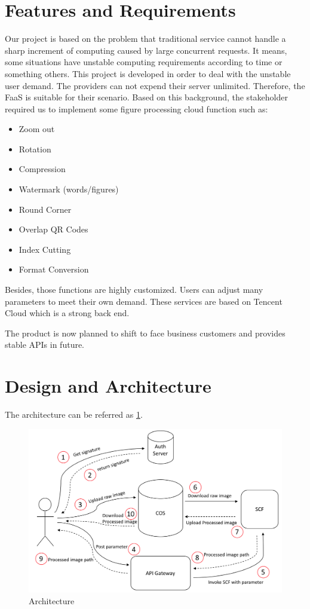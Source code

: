 \documentclass[a4paper,12pt]{article}
\begin{document}
\section{Features and Requirements}
Our project is based on the problem that traditional service cannot handle a sharp increment of computing caused by large concurrent requests. It means, some situations have unstable computing requirements according to time or something others. This project is developed in order to deal with the unstable user demand. The providers can not expend their server unlimited. Therefore, the FaaS is suitable for their scenario. Based on this background, the stakeholder required us to implement some figure processing cloud function such as:
\begin{itemize}
    \item Zoom out
    \item Rotation
    \item Compression
    \item Watermark (words/figures)
    \item Round Corner
    \item Overlap QR Codes
    \item Index Cutting
    \item Format	Conversion
\end{itemize}

Besides, those functions are highly customized. Users can adjust many parameters to meet their own demand. These services are based on Tencent Cloud which is a strong back end. 

The product is now planned to shift to face business customers and provides stable APIs in future. 

\section{Design and Architecture}

The architecture can be referred as \ref{fig:diagram}.

\begin{figure}[H]

\includegraphics[scale=0.6]{figures/architecture.png}
\caption{\label{fig:diagram}Architecture}
\end{figure}
\end{document}
